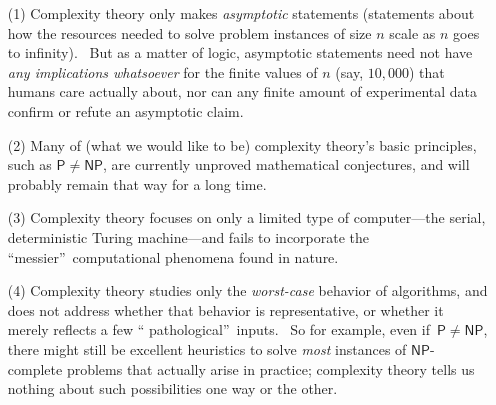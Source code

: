 \documentclass[12pt,onecolumn]{article}%
\begin{document}
\begin{enumerate}
\item[(1)] Complexity theory only makes \textit{asymptotic} statements
(statements about how the resources needed to solve problem instances of size
$n$ scale as $n$ goes to infinity). \ But as a matter of logic, asymptotic
statements need not have \textit{any implications whatsoever} for the finite
values of $n$ (say, $10,000$) that humans care actually about, nor can any
finite amount of experimental data confirm or refute an asymptotic claim.

\item[(2)] Many of (what we would like to be) complexity theory's basic
principles, such as $\mathsf{P}\neq\mathsf{NP}$, are currently unproved
mathematical conjectures, and will probably remain that way for a long time.

\item[(3)] Complexity theory focuses on only a limited type of computer---the
serial, deterministic Turing machine---and fails to incorporate the
\textquotedblleft messier\textquotedblright\ computational phenomena found in nature.

\item[(4)] Complexity theory studies only the \textit{worst-case} behavior of
algorithms, and does not address whether that behavior is representative, or
whether it merely reflects a few \textquotedblleft
pathological\textquotedblright\ inputs. \ So for example, even if\ $\mathsf{P}%
\neq\mathsf{NP}$, there might still be excellent heuristics to solve
\textit{most} instances of $\mathsf{NP}$-complete problems that actually arise
in practice; complexity theory tells us nothing about such possibilities one
way or the other.
\end{enumerate}
\end{document}
